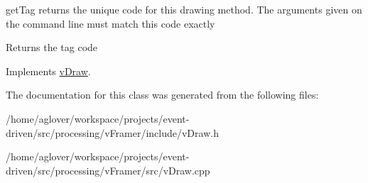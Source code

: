 get\+Tag returns the unique code for this drawing method. The arguments given on the command line must match this code exactly 

\begin{DoxyReturn}{Returns}
the tag code 
\end{DoxyReturn}


Implements \hyperlink{classvDraw_abb4aa2bb3bb8daca40bdb12cd55d3fd3}{v\+Draw}.



The documentation for this class was generated from the following files\+:\begin{DoxyCompactItemize}
\item 
/home/aglover/workspace/projects/event-\/driven/src/processing/v\+Framer/include/v\+Draw.\+h\item 
/home/aglover/workspace/projects/event-\/driven/src/processing/v\+Framer/src/v\+Draw.\+cpp\end{DoxyCompactItemize}
